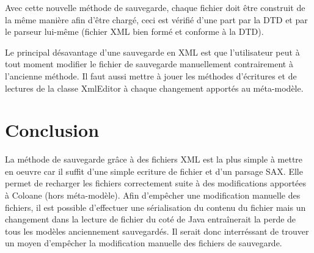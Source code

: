 \documentclass{article}
\begin{document}
Avec cette nouvelle m\'ethode de sauvegarde, chaque fichier doit \^etre construit de la m\^eme mani\`ere afin d'\^etre charg\'e, ceci est v\'erifi\'e d'une part par la DTD et par le parseur lui-m\^eme (fichier XML bien form\'e et conforme \`a la DTD).

Le principal d\'esavantage d'une sauvegarde en XML est que l'utilisateur peut \`a tout moment modifier le fichier de sauvegarde manuellement contrairement \`a l'ancienne m\'ethode.
Il faut aussi mettre \`a jouer les m\'ethodes d'\'ecritures et de lectures de la classe XmlEditor \`a chaque changement apport\'es au m\'eta-mod\`ele.


\section{Conclusion}

La m\'ethode de sauvegarde gr\^ace \`a des fichiers XML est la plus simple \`a mettre en oeuvre car il suffit d'une simple ecriture de fichier et d'un parsage SAX.
Elle permet de recharger les fichiers correctement suite \`a des modifications apport\'ees \`a Coloane (hors m\'eta-mod\`ele).
Afin d'emp\^echer une modification manuelle des fichiers, il est possible d'effectuer une s\'erialisation du contenu du fichier mais un changement dans la lecture de fichier du cot\'e de Java entra\^inerait la perde de tous les mod\`eles anciennement sauvegard\'es.
Il serait donc interr\'essant de trouver un moyen d'emp\^echer la modification manuelle des fichiers de sauvegarde.
\end{document}
